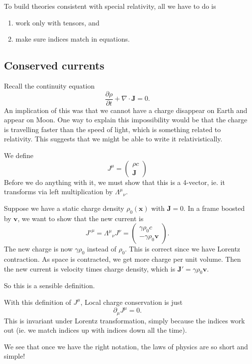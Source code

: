 \documentclass[a4paper]{article}
\begin{document}
To build theories consistent with special relativity, all we have to do is
\begin{enumerate}
  \item work only with tensors, and
  \item make sure indices match in equations.
\end{enumerate}

\subsection{Conserved currents}
Recall the continuity equation
\[
  \frac{\partial\rho}{\partial t} + \nabla\cdot \mathbf{J} = 0.
\]
An implication of this was that we cannot have a charge disappear on Earth and appear on Moon. One way to explain this impossibility would be that the charge is travelling faster than the speed of light, which is something related to relativity. This suggests that we might be able to write it relativistically.

We define
\[
  J^\mu =
  \begin{pmatrix}
    \rho c\\
    \mathbf{J}
  \end{pmatrix}
\]
Before we do anything with it, we must show that this is a 4-vector, ie. it transforms via left multiplication by $\Lambda^\mu\!_\nu$.

Suppose we have a static charge density $\rho_0(\mathbf{x})$ with $\mathbf{J} = 0$. In a frame boosted by $\mathbf{v}$, we want to show that the new current is
\[
  J'^\mu = \Lambda^\mu\!_\nu J^\nu =
  \begin{pmatrix}
    \gamma \rho_0 c\\
    -\gamma \rho_0 \mathbf{v}
  \end{pmatrix}.
\]
The new charge is now $\gamma \rho_0$ instead of $\rho_0$. This is correct since we have Lorentz contraction. As space is contracted, we get more charge per unit volume. Then the new current is velocity times charge density, which is $\mathbf{J}' = \gamma\rho_0 \mathbf{v}$.

So this is a sensible definition.

With this definition of $J^\mu$, Local charge conservation is just
\[
  \partial_\mu J^\mu = 0.
\]
This is invariant under Lorentz transformation, simply because the indices work out (ie. we match indices up with indices down all the time).

We see that once we have the right notation, the laws of physics are so short and simple!
\end{document}
